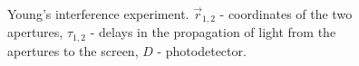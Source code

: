 \begin{figure}
\centering



\caption{Young's interference experiment. $\vec{r}_{1,2}$ - coordinates
  of the two apertures, $\tau_{1,2}$ - delays in the propagation of light from
the apertures to the screen, $D$ - photodetector.}
\label{figPart4Ch2_2}
\end{figure}